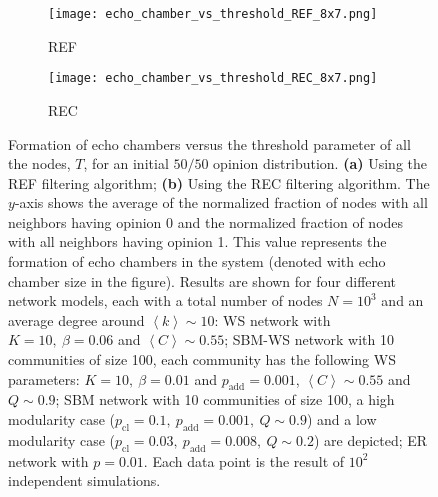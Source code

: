 \documentclass[11 pt , letterpaper , twoside , openright]{book}
\begin{document}
\begin{figure}[H]
  \begin{subfigure}[b]{0.49\textwidth}
  	\texttt{[image: echo\_chamber\_vs\_threshold\_REF\_8x7.png]}
    \caption{REF}
    \label{REF_thres}
  \end{subfigure}
  \begin{subfigure}[b]{0.49\textwidth}
  	\texttt{[image: echo\_chamber\_vs\_threshold\_REC\_8x7.png]}
    \caption{REC}
    \label{REC_thres}
  \end{subfigure}
  \captionsetup{format=plain}
  \caption[Formation of echo chambers versus the threshold parameter of all the nodes, $T$, for the REF and REC filtering algorithms and an initial $50/50$ opinion distribution]{Formation of echo chambers versus the threshold parameter of all the nodes, $T$, for an initial $50/50$ opinion distribution. \textbf{(a)} Using the REF filtering algorithm; \textbf{(b)} Using the REC filtering algorithm. The $y$-axis shows the average of the normalized fraction of nodes with all neighbors having opinion 0 and the normalized fraction of nodes with all neighbors having opinion 1. This value represents the formation of echo chambers in the system (denoted with echo chamber size in the figure). Results are shown for four different network models, each with a total number of nodes $N=10^3$ and an average degree around $\left<k\right> \sim 10$: WS network with $K =10,\ \beta = 0.06$ and $\left<C\right> \sim 0.55$; SBM-WS network with 10 communities of size 100, each community has the following WS parameters: $K = 10,\ \beta = 0.01$ and $p_{\text{add}} = 0.001$, $\left<C\right> \sim 0.55$ and $Q \sim 0.9$; SBM network with 10 communities of size 100, a high modularity case ($p_{\text{cl}} = 0.1,\ p_{\text{add}} = 0.001,\ Q \sim 0.9$) and a low modularity case ($p_{\text{cl}} = 0.03,\ p_{\text{add}} = 0.008,\ Q \sim 0.2$) are depicted; ER network with $p= 0.01$. Each data point is the result of $10^2$ independent simulations.}
\label{echo_vs_threshold_REF-REC}
\end{figure}
\noindent
\end{document}
